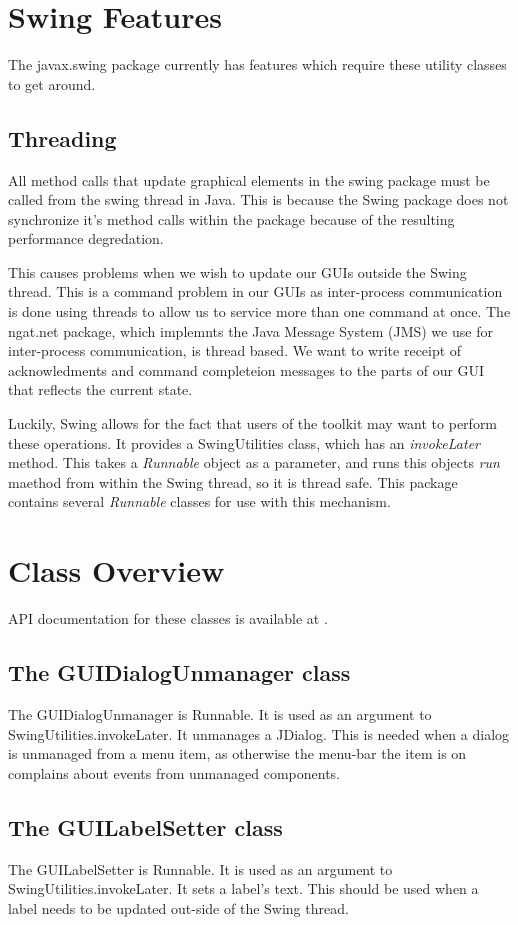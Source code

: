 \documentclass[10pt,a4paper]{article}
\begin{document}
\section{Swing Features}
The javax.swing package currently has features which require these utility classes to get around.

\subsection{Threading}
All method calls that update graphical elements in the swing package must be called from the swing thread in Java.
This is because the Swing package does not synchronize it's method calls within the package because of
the resulting performance degredation.

This causes problems when we wish to update our GUIs outside the Swing thread. This is a command problem in our GUIs
as inter-process communication is done using threads to allow us to service more than one command at once. The ngat.net
package, which implemnts the Java Message System (JMS) we use for inter-process communication, is thread based. We
want to write receipt of acknowledments and command completeion messages to the parts of our GUI that
reflects the current state.

Luckily, Swing allows for the fact that users of the toolkit may want to perform these operations. It provides a 
SwingUtilities class, which has an {\em invokeLater} method. This takes a {\em Runnable} object as a parameter,
and runs this objects {\em run} maethod from within the Swing thread, so it is thread safe. This package contains
several {\em Runnable} classes for use with this mechanism.

\section{Class Overview}
API documentation for these classes is available at \cite{bib:ngatswingtree}.

\subsection{The GUIDialogUnmanager class}
The GUIDialogUnmanager is Runnable. It is used as an argument to SwingUtilities.invokeLater.
It unmanages a JDialog. This is needed when a dialog is unmanaged from a menu item, as otherwise
the menu-bar the item is on complains about events from unmanaged components.

\subsection{The GUILabelSetter class}
The GUILabelSetter is Runnable. It is used as an argument to SwingUtilities.invokeLater.
It sets a label's text. This should be used when a label needs to be updated out-side of the Swing
thread.
\end{document}
